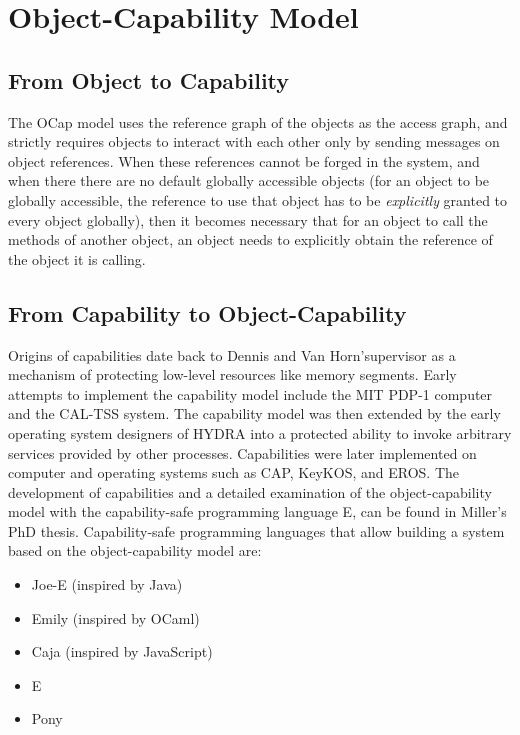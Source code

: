 \documentclass[a4paper,11pt,twoside]{article}
\begin{document}
\section{Object-Capability Model}\label{sec:ocapmodel}
\subsection{From Object to Capability}
The OCap model uses the reference graph of the objects as the access graph, and strictly requires objects to interact with each other only by sending messages on object references\cite{miller2003b}. When these references cannot be forged in the system, and when there there are no default globally accessible objects (for an object to be globally accessible, the reference to use that object has to be \textit{explicitly} granted to every object globally), then it becomes necessary that for an object to call the methods of another object, an object needs to explicitly obtain the reference of the object it is calling.

\subsection{From Capability to Object-Capability}
Origins of capabilities date back to Dennis and Van Horn\cite{dennis1966}'supervisor as a mechanism of protecting low-level resources like memory segments. Early attempts to implement the capability model include the MIT PDP-1 computer and the CAL-TSS system. The capability model was then extended by the early operating system designers of HYDRA\cite{wulf1974} into a protected ability to invoke arbitrary services provided by other processes. Capabilities were later implemented on computer and operating systems such as CAP\cite{wilkes1979}, KeyKOS\cite{hardy1985}, and EROS\cite{shapiro1999}. The development of capabilities and a detailed examination of the object-capability model with the capability-safe programming language E, can be found in Miller's PhD thesis\cite{miller2006}. Capability-safe programming languages that allow building a system based on the object-capability model are:\begin{itemize}
\item Joe-E (inspired by Java)
\item Emily (inspired by OCaml)
\item Caja (inspired by JavaScript)
\item E
\item Pony
\end{itemize}
\end{document}
